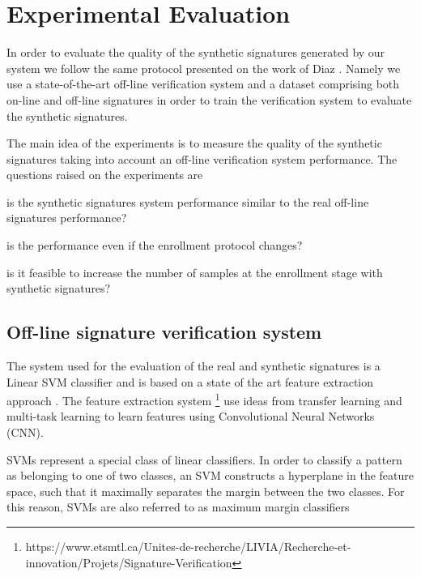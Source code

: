 
\chapter{Experimental Evaluation}\label{ch:exp}

In order to evaluate the quality of the synthetic signatures generated by our system we follow the same protocol presented on the work of Diaz \cite{diaz2014generation}. Namely we use a state-of-the-art off-line verification system and a dataset comprising both on-line and off-line signatures in order to train the verification system to evaluate the synthetic signatures.

The main idea of the experiments is to measure the quality of the synthetic signatures taking into account an off-line verification system performance. The questions raised on the experiments are \begin{inlinelist}
  \item is the synthetic signatures system performance similar to the real off-line signatures performance?
  \item is the performance even if the enrollment protocol changes?
  \item is it feasible to increase the number of samples at the enrollment stage with synthetic signatures? 
\end{inlinelist}



\section{Off-line signature verification system}
The system used for the evaluation of the real and synthetic signatures is a Linear SVM classifier and is based on a state of the art feature extraction approach  \cite{hafemann2017learning}. The feature extraction system \footnote{https://www.etsmtl.ca/Unites-de-recherche/LIVIA/Recherche-et-innovation/Projets/Signature-Verification} use ideas from transfer learning and multi-task learning to learn features using Convolutional Neural Networks (CNN).

SVMs represent a special class of linear classifiers. In order to classify a pattern as
belonging to one of two classes, an SVM constructs a hyperplane in the feature space,
such that it maximally separates the margin between the two classes. For this reason,
SVMs are also referred to as maximum margin classifiers 


